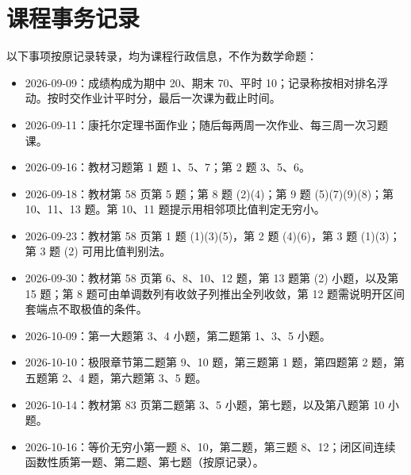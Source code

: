 \documentclass[11pt,a4paper,UTF8]{ctexart}
\theoremstyle{definition}\newtheorem{definition}[theorem]{定义}
\theoremstyle{remark}\newtheorem{remark}[theorem]{说明}
\begin{document}
\section{课程事务记录}
以下事项按原记录转录，均为课程行政信息，不作为数学命题：
\begin{itemize}
\item 2026-09-09：成绩构成为期中 20、期末 70、平时 10；记录称按相对排名浮动。按时交作业计平时分，最后一次课为截止时间。
\item 2026-09-11：康托尔定理书面作业；随后每两周一次作业、每三周一次习题课。
\item 2026-09-16：教材习题第 1 题 1、5、7；第 2 题 3、5、6。
\item 2026-09-18：教材第 58 页第 5 题；第 8 题 (2)(4)；第 9 题 (5)(7)(9)(8)；第 10、11、13 题。第 10、11 题提示用相邻项比值判定无穷小。\item 2026-09-23：教材第 58 页第 1 题 (1)(3)(5)，第 2 题 (4)(6)，第 3 题 (1)(3)；第 3 题 (2) 可用比值判别法。
\item 2026-09-30：教材第 58 页第 6、8、10、12 题，第 13 题第 (2) 小题，以及第 15 题；第 8 题可由单调数列有收敛子列推出全列收敛，第 12 题需说明开区间套端点不取极值的条件。
\item 2026-10-09：第一大题第 3、4 小题，第二题第 1、3、5 小题。
\item 2026-10-10：极限章节第二题第 9、10 题，第三题第 1 题，第四题第 2 题，第五题第 2、4 题，第六题第 3、5 题。
\item 2026-10-14：教材第 83 页第二题第 3、5 小题，第七题，以及第八题第 10 小题。
\item 2026-10-16：等价无穷小第一题 8、10，第二题，第三题 8、12；闭区间连续函数性质第一题、第二题、第七题（按原记录）。
\end{itemize}
\end{document}
